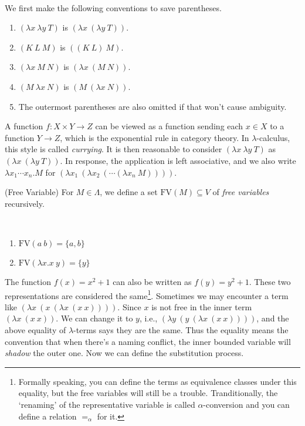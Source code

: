 \

We first make the following conventions to save parentheses.

\begin{enumerate}
    \item $(\lambda x\ \lambda y\ T)$ is $(\lambda x\ (\lambda y\ T))$.
    \item $(K\ L\ M)$ is $((K\ L)\ M)$. 
    \item $(\lambda x\ M\ N)$ is $(\lambda x\ (M\ N))$.
    \item $(M\ \lambda x\ N)$ is $(M\ (\lambda x\ N))$.
    \item The outermost parentheses are also omitted if that won't cause ambiguity. 
\end{enumerate}

\begin{remark}
    A function $f:X\times Y\to Z$ can be viewed as a function
    sending each $x\in X$ to a function $Y\to Z$, which is the
    exponential rule in category theory\cite{cat-awodey}. In 
    $\lambda$-calculus, this style is called {\it currying}.
    It is then reasonable to consider $(\lambda x\ \lambda y\ T)$
    as $(\lambda x\ (\lambda y\ T))$. In response, the application
    is left associative, and we also write 
    $\lambda x_1\cdots x_n.M$ for 
    $(\lambda x_1\ (\lambda x_2\ (\cdots(\lambda x_n\ M))))$.
\end{remark}



\newcommand{\FV}{{\text{FV}}}
\begin{definition}
    (Free Variable) For $M\in\Lambda$, we define a set $\FV(M)\subseteq V$
    of {\it free variables} recursively.
    \eq{
        \FV(x) & = \{x\} \\
        \FV(\lambda x.P) &= \FV(P)\setminus\{x\} \\
        \FV(P\ Q) &= \FV(P)\cup \FV(Q)
    }
\end{definition}

\begin{example}
    \
    \begin{enumerate}
        \item $\FV(a\ b)=\{a,b\}$
        \item $\FV(\lambda x.x\ y)=\{y\}$
    \end{enumerate}
\end{example}

The function $f(x)=x^2+1$ can also be written as $f(y)=y^2+1$. These two
representations are considered the same\footnote{Formally speaking, you
can define the terms as equivalence classes under this equality, but the
free variables will still be a trouble. Tranditionally, the `renaming'
of the representative variable is called $\alpha$-conversion and you can
define a relation $=_\alpha$ for it.}. Sometimes we may encounter a term
like $(\lambda x\ (x\ (\lambda x\ (x\ x))))$. Since $x$ is not free in the
inner term $(\lambda x\ (x\ x))$. We can change it to $y$, i.e.,
$(\lambda y\ (y\ (\lambda x\ (x\ x))))$, and the above equality of 
$\lambda$-terms says they are the same. Thus the equality means the
convention that when there's a naming conflict, the inner bounded 
variable will {\it shadow} the outer one. Now we can define the 
substitution process.


